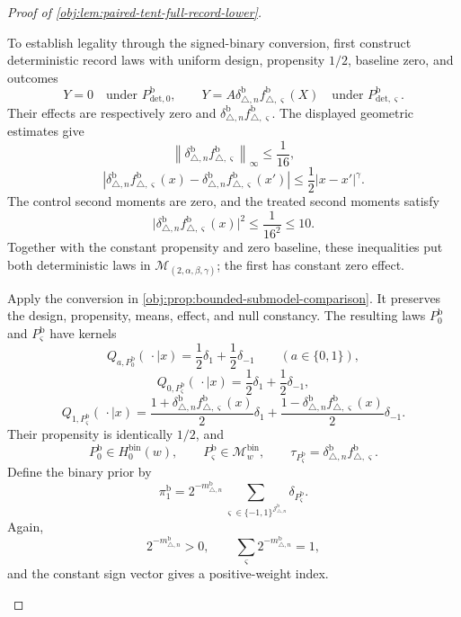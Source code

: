 \begin{proof}[Proof of \cref{obj:lem:paired-tent-full-record-lower}]
\begin{enumerate}
To establish legality through the signed-binary conversion, first construct
deterministic record laws with uniform design, propensity \(1/2\), baseline
zero, and outcomes
\[
Y=0
\quad\text{under }P_{\mathrm{det},0}^{\mathrm b},
\qquad
Y=A\delta_{\triangle,n}^{\mathrm b}
f_{\triangle,\varsigma}^{\mathrm b}(X)
\quad\text{under }P_{\mathrm{det},\varsigma}^{\mathrm b}.
\]
Their effects are respectively zero and
\(\delta_{\triangle,n}^{\mathrm b}f_{\triangle,\varsigma}^{\mathrm b}\).
The displayed geometric estimates give
\[
\left\|
\delta_{\triangle,n}^{\mathrm b}f_{\triangle,\varsigma}^{\mathrm b}
\right\|_\infty\le\frac1{16},
\]
\[
\left|
\delta_{\triangle,n}^{\mathrm b}f_{\triangle,\varsigma}^{\mathrm b}(x)
-\delta_{\triangle,n}^{\mathrm b}f_{\triangle,\varsigma}^{\mathrm b}(x')
\right|
\le\frac12|x-x'|^\gamma.
\]
The control second moments are zero, and the treated second moments satisfy
\[
\bigl|\delta_{\triangle,n}^{\mathrm b}
f_{\triangle,\varsigma}^{\mathrm b}(x)\bigr|^2
\le\frac1{16^2}\le10.
\]
Together with the constant propensity and zero baseline, these inequalities
put both deterministic laws in
\(\mathcal M_{(2,\alpha,\beta,\gamma)}\); the first has constant zero effect.

Apply the conversion in \cref{obj:prop:bounded-submodel-comparison}. It
preserves the design, propensity, means, effect, and null constancy. The
resulting laws \(P_0^{\mathrm b}\) and \(P_\varsigma^{\mathrm b}\) have kernels
\[
Q_{a,P_0^{\mathrm b}}(\,\cdot\mid x)
=\frac12\delta_1+\frac12\delta_{-1}
\qquad(a\in\{0,1\}),
\]
\[
Q_{0,P_\varsigma^{\mathrm b}}(\,\cdot\mid x)
=\frac12\delta_1+\frac12\delta_{-1},
\]
\[
Q_{1,P_\varsigma^{\mathrm b}}(\,\cdot\mid x)
=
\frac{1+\delta_{\triangle,n}^{\mathrm b}
f_{\triangle,\varsigma}^{\mathrm b}(x)}2\delta_1
+
\frac{1-\delta_{\triangle,n}^{\mathrm b}
f_{\triangle,\varsigma}^{\mathrm b}(x)}2\delta_{-1}.
\]
Their propensity is identically \(1/2\), and
\[
P_0^{\mathrm b}\in H_0^{\mathrm{bin}}(w),
\qquad
P_\varsigma^{\mathrm b}\in\mathcal M_w^{\mathrm{bin}},
\qquad
\tau_{P_\varsigma^{\mathrm b}}
=\delta_{\triangle,n}^{\mathrm b}f_{\triangle,\varsigma}^{\mathrm b}.
\]
Define the binary prior by
\[
\pi_1^{\mathrm b}
=
2^{-m_{\triangle,n}^{\mathrm b}}
\sum_{\varsigma\in\{-1,1\}^{\mathscr J_{\triangle,n}^{\mathrm b}}}
\delta_{P_\varsigma^{\mathrm b}}.
\]
Again,
\[
2^{-m_{\triangle,n}^{\mathrm b}}>0,
\qquad
\sum_\varsigma2^{-m_{\triangle,n}^{\mathrm b}}=1,
\]
and the constant sign vector gives a positive-weight index.


\end{enumerate}
\end{proof}
